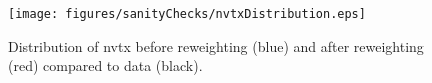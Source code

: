 \begin{figure}[htbp]
\begin{center} 
  \texttt{[image: figures/sanityChecks/nvtxDistribution.eps]}
\caption{Distribution of nvtx before reweighting (blue) and after reweighting (red) compared to data (black).}
\label{fig:Fit2ele}
\end{center}
\end{figure}

%
%
%
%
%
%
%
%
